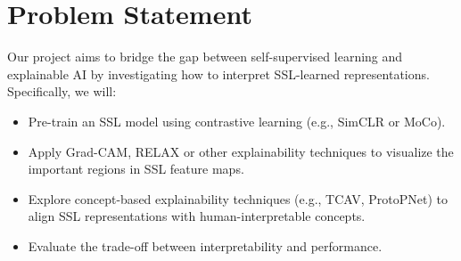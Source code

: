 \section{Problem Statement}
\label{sec:problem_statement}

Our project aims to bridge the gap between self-supervised learning and explainable AI by investigating how to interpret SSL-learned representations. Specifically, we will:
\begin{itemize}
    \item Pre-train an SSL model using contrastive learning (e.g., SimCLR\cite{chen2020simple} or MoCo).
    \item Apply Grad-CAM\cite{Selvaraju_2017_ICCV}, RELAX\cite{wickstrøm2022relaxrepresentationlearningexplainability} or other explainability techniques to visualize the important regions in SSL feature maps.
    \item Explore concept-based explainability techniques (e.g., TCAV, ProtoPNet) to align SSL representations with human-interpretable concepts.
    \item Evaluate the trade-off between interpretability and performance.
\end{itemize}
